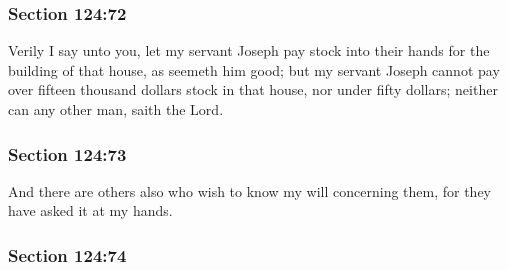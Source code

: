 
	\subsubsection{Section 124:72} %
		\label{DC124-72}

		Verily I say unto you, let my servant Joseph pay stock into their hands for the building of that house, as seemeth him good; but my servant Joseph cannot pay over fifteen thousand dollars stock in that house, nor under fifty dollars; neither can any other man, saith the Lord.


	\subsubsection{Section 124:73} %
		\label{DC124-73}

		And there are others also who wish to know my will concerning them, for they have asked it at my hands.


	\subsubsection{Section 124:74} %
		\label{DC124-74}

